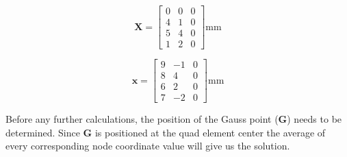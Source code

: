 \documentclass[12pt]{article}
\begin{document}
\begin{minipage}{0.4\textwidth}
  \label{eq:1}  
  \begin{equation}
      \textbf{X} = \begin{bmatrix}
        0 & 0 & 0 \\
        4 & 1 & 0 \\
        5 & 4 & 0 \\
        1 & 2 & 0
      \end{bmatrix} \! \text{mm}
    \end{equation}
\end{minipage}%
\begin{minipage}{0.4\textwidth}
  \label{eq:2}  
  \begin{equation}
      \textbf{x} = \begin{bmatrix}
        9 & -1 & 0 \\
        8 & 4 & 0 \\
        6 & 2 & 0 \\
        7 & -2 & 0
      \end{bmatrix} \! \text{mm}
    \end{equation}
\end{minipage}%

Before any further calculations, the position of the Gauss point (\textbf{G}) needs to be determined. Since \textbf{G} is positioned at the quad element center the average of every corresponding node coordinate value will give us the solution.
\end{document}
